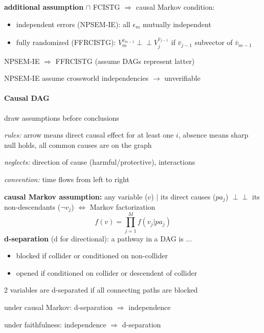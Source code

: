 \documentclass[8pt,twoside]{extarticle}
\newcommand{\indep}{\perp \!\!\! \perp}
\begin{document}
\begin{multicols}{2}
\noindent \textbf{additional assumption} $\cap$ FCISTG $\Rightarrow$ causal Markov condition:
\begin{itemize}[itemsep=0em, topsep=0pt, partopsep=0pt,parsep=0pt, leftmargin=1.5em]
\setlength{\itemsep}{0pt}%
\setlength{\parskip}{0pt}
\item independent errors (NPSEM-IE): all $\epsilon_m$ mutually independent
\item fully randomized (FFRCISTG):  $V_m^{\bar{v}_{m-1}} \indep V_j^{\bar{v}_{j-1}}$ if $\bar{v}_{j-1}$ subvector of $\bar{v}_{m-1}$
\end{itemize}

\noindent NPSEM-IE $\Rightarrow$ FFRCISTG (assume DAGs represent latter)

\noindent NPSEM-IE assume crossworld independencies $\to$ unverifiable


\paragraph{Causal DAG} draw assumptions before conclusions


\noindent \textit{rules:}
arrow means direct causal effect for at least one $i$, absence means sharp null holds, all common causes are on the graph


\noindent \textit{neglects:} direction of cause (harmful/protective), interactions

\noindent \textit{convention:} time flows from left to right


\noindent \textbf{causal Markov assumption:} any variable ($v$) $|$ its direct causes ($pa_j$) $\indep$ its non-descendants ($\lnot v_j$) $\Leftrightarrow$ Markov factorization $$f(v) = \textstyle\prod_{j=1}^Mf(v_j|pa_j)$$
\noindent \textbf{d-separation} (d for directional): a pathway in a DAG is ...
\begin{itemize}[itemsep=0em, topsep=0pt, partopsep=0pt,parsep=0pt, leftmargin=1.5em]
\setlength{\itemsep}{0pt}%
\setlength{\parskip}{0pt}
\item blocked if collider or conditioned on non-collider
\item opened if conditioned on collider or descendent of collider
\end{itemize}
2 variables are d-separated if all connecting paths are blocked

\noindent under causal Markov: d-separation $\Rightarrow$ independence

\noindent under faithfulness: independence $\Rightarrow$ d-separation


\end{multicols}
\end{document}
